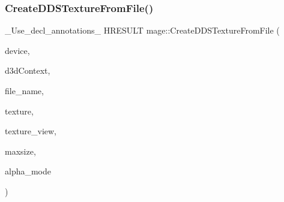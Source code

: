 \hypertarget{namespacemage_a09b30fe2a483b0d96578ab720715e80a}{}\label{namespacemage_a09b30fe2a483b0d96578ab720715e80a} 
\subsubsection{\texorpdfstring{Create\+D\+D\+S\+Texture\+From\+File()}{CreateDDSTextureFromFile()}\hspace{0.1cm}{\footnotesize\ttfamily [4/4]}}
{\footnotesize\ttfamily \+\_\+\+Use\+\_\+decl\+\_\+annotations\+\_\+ H\+R\+E\+S\+U\+LT mage\+::\+Create\+D\+D\+S\+Texture\+From\+File (\begin{DoxyParamCaption}\item[{\hyperlink{namespacemage_ae74f374780900893caa5555d1031fd79}{Com\+Ptr}$<$ I\+D3\+D11\+Device2 $>$}]{device,  }\item[{I\+D3\+D11\+Device\+Context $\ast$}]{d3d\+Context,  }\item[{const wchar\+\_\+t $\ast$}]{file\+\_\+name,  }\item[{I\+D3\+D11\+Resource $\ast$$\ast$}]{texture,  }\item[{I\+D3\+D11\+Shader\+Resource\+View $\ast$$\ast$}]{texture\+\_\+view,  }\item[{size\+\_\+t}]{maxsize,  }\item[{\hyperlink{namespacemage_a0c586a2bad862f4858900ca121ca80c2}{D\+D\+S\+\_\+\+A\+L\+P\+H\+A\+\_\+\+M\+O\+DE} $\ast$}]{alpha\+\_\+mode }\end{DoxyParamCaption})}

\hypertarget{namespacemage_af416c510d74455dca0d9608f079685a7}{}\label{namespacemage_af416c510d74455dca0d9608f079685a7} 
